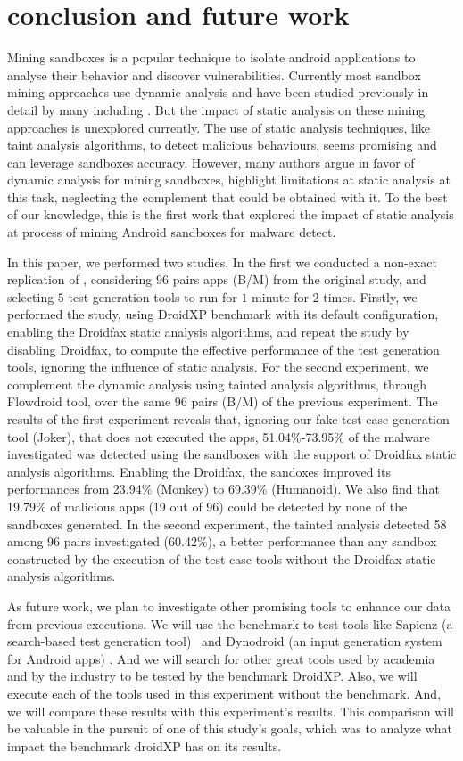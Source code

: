 \section{conclusion and future work}

Mining sandboxes is a popular technique to isolate android applications to analyse their behavior and discover vulnerabilities. Currently most sandbox mining approaches use dynamic analysis and have been studied previously in detail by many including \blls. But the impact of static analysis on these mining approaches is unexplored currently. The use of static analysis techniques, like taint analysis algorithms, to detect malicious behaviours, seems promising and can leverage sandboxes accuracy. However, many authors argue in favor of dynamic analysis for  mining sandboxes, highlight limitations at static analysis at this task, neglecting the complement that could be obtained with it. To the best of our knowledge, this is the first work that explored the impact of static analysis at process of mining Android sandboxes for malware detect.

In this paper, we performed two studies. In the first we conducted a non-exact replication of \blls, considering $96$ pairs apps (B/M) from the original study, and selecting $5$ test generation tools to run for $1$ minute for $2$ times. Firstly, we performed the study, using DroidXP benchmark with its default configuration, enabling the Droidfax static analysis algorithms, and repeat the study by disabling Droidfax, to compute the effective performance of the test generation tools, ignoring the influence of static analysis. For the second experiment, we complement the dynamic analysis using tainted analysis algorithms, through Flowdroid tool, over the same $96$ pairs (B/M) of the previous experiment. The results of the first experiment reveals that, ignoring our fake test case generation tool (Joker), that does not executed the apps, 51.04\%-73.95\% of the malware investigated was detected using the sandboxes with the support of Droidfax static analysis algorithms. Enabling the Droidfax, the sandoxes improved its performances from 23.94\% (Monkey) to 69.39\% (Humanoid). We also find that 19.79\% of malicious apps (19 out of 96) could be detected by none of the sandboxes generated. In the second experiment, the tainted analysis detected 58 among 96 pairs investigated (60.42\%), a better performance than any sandbox constructed by the execution of the test case tools without the Droidfax static analysis algorithms. 

As future work, we plan to investigate other promising tools to enhance our data from previous executions. We will use the benchmark to test tools like Sapienz (a search-based test generation tool)~\cite{DBLP:conf/issta/MaoHJ16} and Dynodroid (an input generation system for Android apps) \cite{DBLP:conf/sigsoft/MachiryTN13}. And we will search for other great tools used by academia and by the industry to be tested by the benchmark DroidXP.
Also, we will execute each of the tools used in this experiment without the benchmark. And, we will compare these results with this experiment's results. This comparison will be valuable in the pursuit of one of this study's goals, which was to analyze what impact the benchmark droidXP has on its results.

